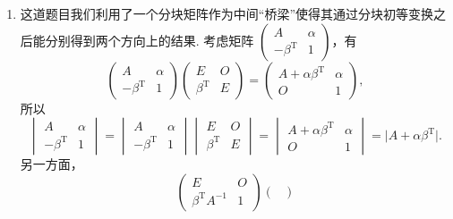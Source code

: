 \begin{enumerate}
    \item 这道题目我们利用了一个分块矩阵作为中间``桥梁''使得其通过分块初等变换之后能分别得到两个方向上的结果. 考虑矩阵 $\begin{pmatrix}
                  A                   & \alpha \\
                  -\beta^{\mathrm{T}} & 1
              \end{pmatrix}$，有
          \[\begin{pmatrix}
                  A                   & \alpha \\
                  -\beta^{\mathrm{T}} & 1
              \end{pmatrix} \begin{pmatrix}
                  E                  & O \\
                  \beta^{\mathrm{T}} & E
              \end{pmatrix} = \begin{pmatrix}
                  A+\alpha \beta^{\mathrm{T}} & \alpha \\
                  O                           & 1
              \end{pmatrix},\]
          所以
          \[\begin{vmatrix}
                  A                   & \alpha \\
                  -\beta^{\mathrm{T}} & 1
              \end{vmatrix} = \begin{vmatrix}
                  A                   & \alpha \\
                  -\beta^{\mathrm{T}} & 1
              \end{vmatrix} \begin{vmatrix}
                  E                  & O \\
                  \beta^{\mathrm{T}} & E
              \end{vmatrix} = \begin{vmatrix}
                  A+\alpha \beta^{\mathrm{T}} & \alpha \\
                  O                           & 1
              \end{vmatrix} = \lvert A+\alpha \beta^{\mathrm{T}} \rvert.\]
          另一方面，
          \[\begin{pmatrix}
                  E                        & O \\
                  \beta^{\mathrm{T}}A^{-1} & 1
              \end{pmatrix} \begin{pmatrix}

\end{pmatrix}\]
\end{enumerate}
